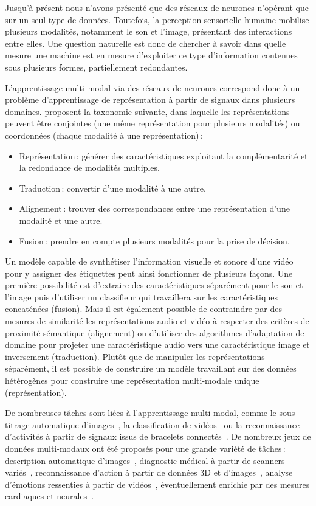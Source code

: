 Jusqu'à présent nous n'avons présenté que des réseaux de neurones n'opérant que sur un seul type de données. Toutefois, la perception sensorielle humaine mobilise plusieurs modalités, notamment le son et l'image, présentant des interactions entre elles. Une question naturelle est donc de chercher à savoir dans quelle mesure une machine est en mesure d'exploiter ce type d'information contenues sous plusieurs formes, partiellement redondantes.

L'apprentissage multi-modal via des réseaux de neurones correspond donc à un problème d'apprentissage de représentation à partir de signaux dans plusieurs domaines. \citet{baltrusaitis_multimodal_2017} proposent la taxonomie suivante, dans laquelle les représentations peuvent être conjointes (une même représentation pour plusieurs modalités) ou coordonnées (chaque modalité à une représentation)\,:
\begin{itemize}
    \item Représentation\,: générer des caractéristiques exploitant la complémentarité et la redondance de modalités multiples.
    \item Traduction\,: convertir d'une modalité à une autre.
    \item Alignement\,: trouver des correspondances entre une représentation d'une modalité et une autre.
    \item Fusion\,: prendre en compte plusieurs modalités pour la prise de décision.
\end{itemize}

Un modèle capable de synthétiser l'information visuelle et sonore d'une vidéo pour y assigner des étiquettes peut ainsi fonctionner de plusieurs façons. Une première possibilité est d'extraire des caractéristiques séparément pour le son et l'image puis d'utiliser un classifieur qui travaillera sur les caractéristiques concaténées (fusion). Mais il est également possible de contraindre par des mesures de similarité les représentations audio et vidéo à respecter des critères de proximité sémantique (alignement) ou d'utiliser des algorithmes d'adaptation de domaine pour projeter une caractéristique audio vers une caractéristique image et inversement (traduction). Plutôt que de manipuler les représentations séparément, il est possible de construire un modèle travaillant sur des données hétérogènes pour construire une représentation multi-modale unique (représentation).

De nombreuses tâches sont liées à l'apprentissage multi-modal, comme le sous-titrage automatique d'images~\cite{karpathy_deep_2015}, la classification de vidéos~\cite{kim_deep_2013} ou la reconnaissance d'activités à partir de signaux issus de bracelets connectés~\cite{ordonez_deep_2016}. De nombreux jeux de données multi-modaux ont été proposés pour une grande variété de tâches\,: description automatique d'images~\cite{hodosh_framing_2013}, diagnostic médical à partir de scanners variés~\cite{menze_multimodal_2015}, reconnaissance d'action à partir de données 3D et d'images~\cite{ofli_berkeley_2013}, analyse d'émotions ressenties à partir de vidéos~\cite{schuller_avec_2011}, éventuellement enrichie par des mesures cardiaques et neurales~\cite{ringeval_introducing_2013}.

